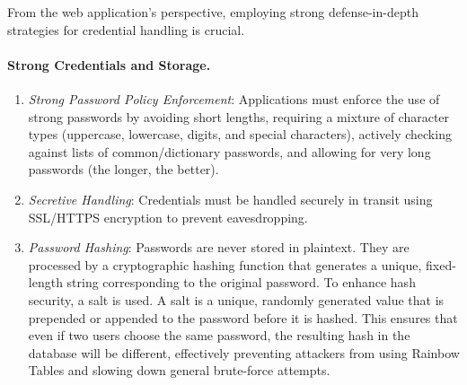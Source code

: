 From the web application's perspective, employing strong defense-in-depth strategies for credential handling is crucial.

\paragraph{Strong Credentials and Storage.}

\begin{enumerate}
    \item \textit{Strong Password Policy Enforcement}: Applications must enforce the use of strong passwords by avoiding short lengths, requiring a mixture of character types (uppercase, lowercase, digits, and special characters), actively checking against lists of common/dictionary passwords, and allowing for very long passwords (the longer, the better).
    \item \textit{Secretive Handling}: Credentials must be handled securely in transit using SSL/HTTPS encryption to prevent eavesdropping.
    \item \textit{Password Hashing}: Passwords are never stored in plaintext. They are processed by a cryptographic hashing function that generates a unique, fixed-length string corresponding to the original password. To enhance hash security, a salt is used. A salt is a unique, randomly generated value that is prepended or appended to the password before it is hashed. This ensures that even if two users choose the same password, the resulting hash in the database will be different, effectively preventing attackers from using Rainbow Tables and slowing down general brute-force attempts.
\end{enumerate}

